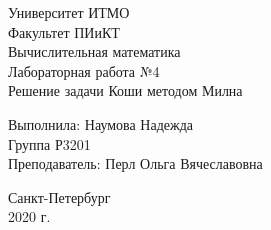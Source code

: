 \newpage
\thispagestyle{empty}
\begin{center}

Университет ИТМО\\
\vspace{1cm}
Факультет ПИиКТ \\
 \vspace{10cm}
Вычислительная математика \\
 \vspace{1em}
Лабораторная работа №4 \\
 \vspace{1em}
Решение задачи Коши методом Милна\\
\vspace{5cm}
\end{center}
\begin{flushright}
Выполнила: Наумова Надежда \\
Группа Р3201 \\
Преподаватель: Перл Ольга Вячеславовна \\
\end{flushright}
\vspace{3.5cm}
\begin{center}
Санкт-Петербург \\ 
2020 г.
\end{center}
